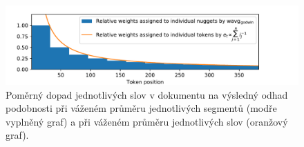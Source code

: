 \documentclass[aspectratio=169,t]{beamer}
\begin{document}
\begin{frame}[c]
\begin{figure}
\vfill
\begin{center}
\includegraphics[trim={0.8cm 0.0cm 2.8cm 0.5cm}, scale=0.8]{figs/quality-evaluation-4}
\end{center}
\caption{Poměrný dopad jednotlivých slov v dokumentu na výsledný odhad
  podobnosti při váženém průměru jednotlivých segmentů (modře vyplněný graf) a
  při váženém průměru jednotlivých slov (oranžový graf).}
\end{figure}
\end{frame}

\end{document}
